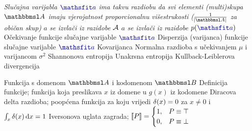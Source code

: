  	{\textit{Slučajna varijabla $\rvar a$ ima takvu razdiobu da svi elementi (multi)skupa $\set A$ imaju vjerojatnost proporcionalnu višestrukosti ($\frac{1}{\envert{\set A}}$ za običan skup)}}
 {\textit{$a$ se izvlači iz razidobe $\mathcal{A}$}}
 {\textit{$a$ se izvlači iz razidobe $p(\rvar a)$}}
 {Očekivanje funkcije slučajne varijable $\rvar a$}
 {Disperzija (varijanca) funkcije slučajne varijable $\rvar a$}
		{Kovarijanca}
 {Normalna razdioba s učekivanjem $\mu$ i varijancom $\sigma^2$}
			{Shannonova entropija}
 {Unakrsna entropija}
		{Kullback-Leiblerova divergencija}

 {Funkcija s domenom $\set A$ i kodomenom $\set B$}
 {Definicija funkcije; funkcija koja preslikava $x$ iz domene u $g(x)$ iz kodomene}
	{Diracova delta razdioba; poopćena funkcija za koju vrijedi $\delta(x)=0$ za $x\neq0$ i $\int_x\dirac(x)\dif x=1$}
 {Iversonova uglata zagrada; $\enbbracket{P}=\begin{cases} 1, & P \equiv \top \\ 0, & P \equiv \bot \end{cases}$}

